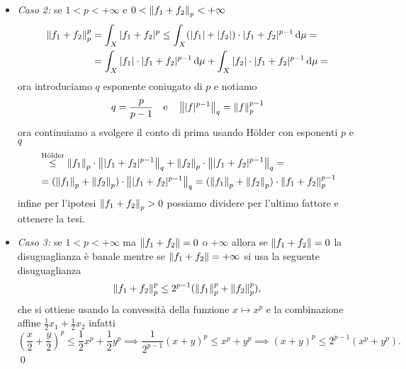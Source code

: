 \begin{itemize}
	\item \textit{Caso 2:} se $1 < p < +\infty$ e $0 < \left\lVert f_1 + f_2 \right\rVert_p < +\infty$
		$$
		\begin{aligned}
			\left\lVert f_1 + f_2 \right\rVert_p^p 
			&= \int_X |f_1 + f_2|^p 
			\leq \int_X (|f_1| + |f_2|) \cdot |f_1 + f_2|^{p-1} \,\mathrm{d} \mu = \\
			&= \int_X |f_1| \cdot |f_1 + f_2|^{p-1} \,\mathrm{d} \mu + \int_X |f_2| \cdot |f_1 + f_2|^{p-1} \,\mathrm{d} \mu =
		\end{aligned}
		$$
		ora introduciamo $q$ esponente coniugato di $p$ e notiamo
		$$
		q = \frac{p}{p-1} 
		\quad
		\text{e}
		\quad
		\left\lVert |f|^{p-1} \right\rVert_q = \left\lVert f \right\rVert_p^{p-1}
		$$
		ora continuiamo a svolgere il conto di prima usando H\"older con esponenti $p$ e $q$
		$$
		\begin{aligned}
		&\overset{\text{H\"older}}{\leq} \left\lVert f_1 \right\rVert_p \cdot \left\lVert |f_1 + f_2|^{p-1} \right\rVert_q + \left\lVert f_2 \right\rVert_p \cdot \left\lVert |f_1 + f_2|^{p-1} \right\rVert_q = \\
			& = (\left\lVert f_1 \right\rVert_p + \left\lVert f_2 \right\rVert_p) \cdot \left\lVert |f_1 + f_2|^{p-1} \right\rVert_q 
			= (\left\lVert f_1 \right\rVert_p + \left\lVert f_2 \right\rVert_p) \cdot \left\lVert f_1 + f_2 \right\rVert_p^{p-1}  \\
		\end{aligned}
		$$
		infine per l'ipotesi $\left\lVert f_1 + f_2 \right\rVert_p > 0$ possiamo dividere per l'ultimo fattore e ottenere la tesi.

	\item \textit{Caso 3:} se $1 < p < +\infty$ ma $\left\lVert f_1 + f_2 \right\rVert = 0$ o $+\infty$ allora se $\left\lVert f_1 + f_2 \right\rVert = 0$ la disuguaglianza è banale mentre se $\left\lVert f_1 + f_2 \right\rVert = +\infty$ si usa la seguente disuguaglianza
		$$
			\left\lVert f_1 + f_2 \right\rVert_p^p \leq 2^{p-1} (\left\lVert f_1 \right\rVert_p^p + \left\lVert f_2 \right\rVert_p^p),
		$$
		che si ottiene usando la convessità della funzione $x \mapsto x^p$ e la combinazione affine $\frac{1}{2}x_1 + \frac{1}{2}x_2$ infatti
		$$
			\left( \frac{x}{2} + \frac{y}{2} \right)^p \leq \frac{1}{2} x^p + \frac{1}{2} y^p 
			\implies \frac{1}{2^{p-1}} (x+y)^p \leq x^p + y^p 
			\implies (x+y)^p \leq 2^{p-1} (x^p + y^p).
		$$
\qed
\end{itemize}

